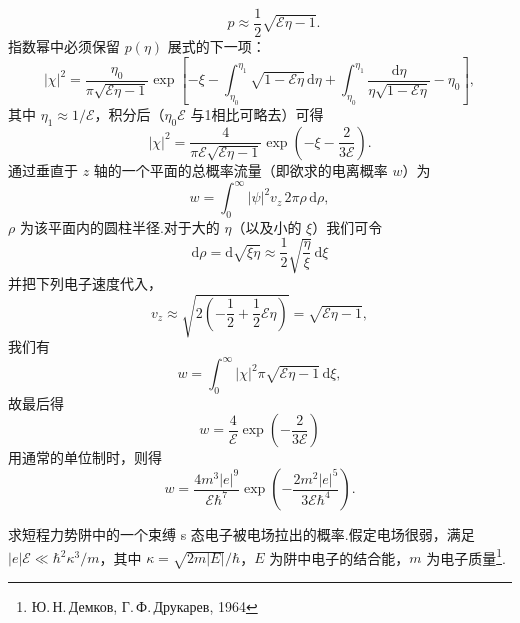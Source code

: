 \begin{xiti}
\begin{equation*}
  \qquad
  p\approx\frac{1}{2}\sqrt{\mathcal{E}\eta-1}.
\end{equation*}
指数幂中必须保留 $p(\eta)$ 展式的下一项：
\begin{equation*}
  |\chi|^{2}=\frac{\eta_0}{\pi\sqrt{\mathcal{E}\eta-1}}
  \exp\left[-\xi-\int_{\eta_0}^{\eta_1}\sqrt{1-\mathcal{E}\eta}\,\mathrm{d}\eta
  +\int_{\eta_0}^{\eta_1}\frac{\mathrm{d}\eta}{\eta\sqrt{1-\mathcal{E}\eta}}-\eta_0\right],
\end{equation*}
其中 $\eta_1\approx1/\mathcal{E}$，积分后（$\eta_0\mathcal{E}$ 与1相比可略去）可得
\begin{equation}
  |\chi|^{2}=\frac{4}{\pi\mathcal{E}\sqrt{\mathcal{E}\eta-1}}
  \exp\left(-\xi-\frac{2}{3\mathcal{E}}\right).
\end{equation}
通过垂直于 $z$ 轴的一个平面的总概率流量（即欲求的电离概率 $w$）为
\begin{equation*}
  w=\int_0^{\infty}|\psi|^{2}v_z\,2\pi\rho\,\mathrm{d}\rho,
\end{equation*}
$\rho$ 为该平面内的圆柱半径.对于大的 $\eta$（以及小的 $\xi$）我们可令
\begin{equation*}
  \mathrm{d}\rho=\mathrm{d}\sqrt{\xi\eta}\approx\frac{1}{2}\sqrt{\frac{\eta}{\xi}}\,\mathrm{d}\xi
\end{equation*}
并把下列电子速度代入，
\begin{equation*}
  v_z\approx\sqrt{2\left(-\frac{1}{2}+\frac{1}{2}\mathcal{E}\eta\right)}
  =\sqrt{\mathcal{E}\eta-1},
\end{equation*}
我们有
\begin{equation*}
  w=\int_0^{\infty}|\chi|^{2}\pi\sqrt{\mathcal{E}\eta-1}\,\mathrm{d}\xi,
\end{equation*}
故最后得
\begin{equation}
  w=\frac{4}{\mathcal{E}}\exp\left(-\frac{2}{3\mathcal{E}}\right)
\end{equation}
用通常的单位制时，则得
\begin{equation*}
  w=\frac{4m^{3}|e|^{9}}{\mathcal{E}\hbar^{7}}
  \exp\left(-\frac{2m^{2}|e|^{5}}{3\mathcal{E}\hbar^{4}}\right).
\end{equation*}

\quad 求短程力势阱中的一个束缚 s 态电子被电场拉出的概率.假定电场很弱，满足 $|e|\mathcal{E}\ll\hbar^{2}\kappa^{3}/m$，其中 $\kappa=\sqrt{2m|E|}/\hbar$，$E$ 为阱中电子的结合能，$m$ 为电子质量\footnote{Ю.\,Н.\,Демков, Г.\,Ф.\,Друкарев, 1964}.


\end{xiti}
